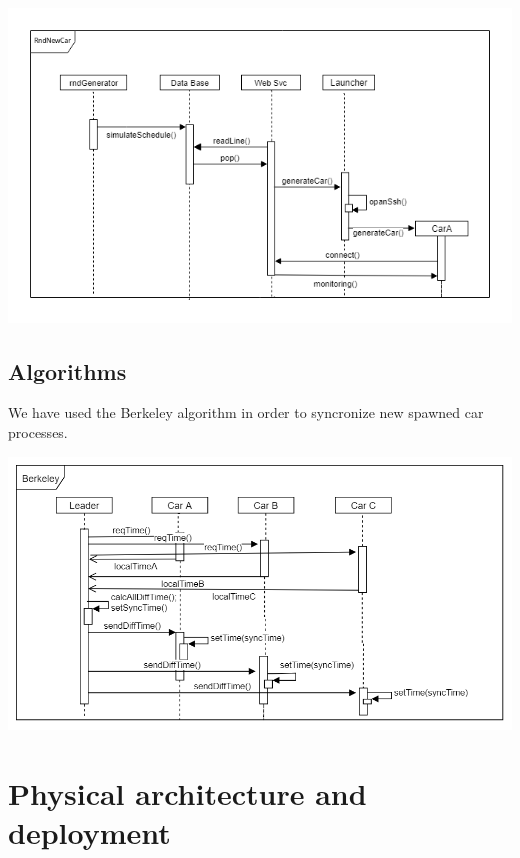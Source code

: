 \begin{center}
    \includegraphics[scale=0.6]{assets/newCarRnd.png}
\end{center}


\subsection{Algorithms}

We have used the Berkeley algorithm in order to syncronize new spawned car processes.

\begin{center}
    \includegraphics[scale=0.6, width=\linewidth]{assets/berkeley.png}
\end{center}

\section{Physical architecture and deployment}

